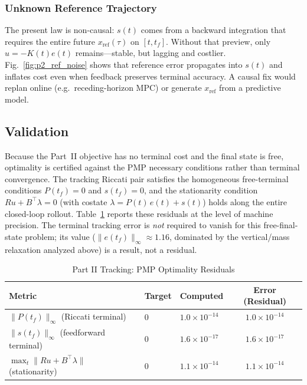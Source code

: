\documentclass[letterpaper, 10 pt, conference]{ieeeconf}
\begin{document}
\subsubsection*{Unknown Reference Trajectory}

The present law is non-causal: $s(t)$ comes from a backward integration that requires the entire future $x_{\text{ref}}(\tau)$ on $[t,t_f]$. Without that preview, only $u=-K(t)e(t)$ remains---stable, but lagging and costlier. Fig.~\ref{fig:p2_ref_noise} shows that reference error propagates into $s(t)$ and inflates cost even when feedback preserves terminal accuracy. A causal fix would replan online (e.g.\ receding-horizon MPC) or generate $x_{\text{ref}}$ from a predictive model.

\subsection{Validation}

Because the Part~II objective has no terminal cost and the final state is free, optimality is certified against the PMP necessary conditions rather than terminal convergence. The tracking Riccati pair satisfies the homogeneous free-terminal conditions $P(t_f)=0$ and $s(t_f)=0$, and the stationarity condition $Ru + B^\top \lambda = 0$ (with costate $\lambda = P(t)\,e(t) + s(t)$) holds along the entire closed-loop rollout. Table~\ref{tab:val_p2} reports these residuals at the level of machine precision. The terminal tracking error is \emph{not} required to vanish for this free-final-state problem; its value ($\lVert e(t_f)\rVert_\infty \approx 1.16$, dominated by the vertical/mass relaxation analyzed above) is a result, not a residual.

\begin{table}[H]
\centering
\footnotesize
\caption{Part II Tracking: PMP Optimality Residuals}
\label{tab:val_p2}
\begin{tabular}{@{}lllc@{}}
\toprule
Metric & Target & Computed & Error (Residual) \\ \midrule
$\|P(t_f)\|_\infty$ (Riccati terminal) & $0$ & $1.0 \times 10^{-14}$ & $1.0 \times 10^{-14}$ \\
$\|s(t_f)\|_\infty$ (feedforward terminal) & $0$ & $1.6 \times 10^{-17}$ & $1.6 \times 10^{-17}$ \\
$\max_t \|Ru + B^\top \lambda\|$ (stationarity) & $0$ & $1.1 \times 10^{-14}$ & $1.1 \times 10^{-14}$ \\
\bottomrule
\end{tabular}
\end{table}
\end{document}

